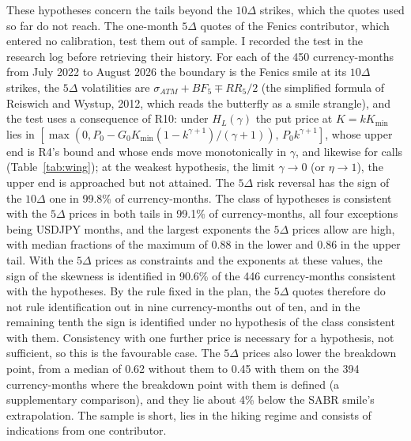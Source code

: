 \documentclass[11pt]{article}
\theoremstyle{result}
\newcommand{\D}{\Delta}
\begin{document}
These hypotheses concern the tails beyond the $10\D$ strikes, which the quotes used so far do not reach. The one-month $5\D$ quotes of the Fenics contributor, which entered no calibration, test them out of sample. I recorded the test in the research log before retrieving their history. For each of the 450 currency-months from July 2022 to August 2026 the boundary is the Fenics smile at its $10\D$ strikes, the $5\D$ volatilities are $\sigma_{ATM}+BF_5\mp RR_5/2$ (the simplified formula of Reiswich and Wystup, 2012, which reads the butterfly as a smile strangle), and the test uses a consequence of R10: under $H_L(\gamma)$ the put price at $K=kK_{\min}$ lies in $[\max(0,P_0-G_0K_{\min}(1-k^{\gamma+1})/(\gamma+1)),\,P_0k^{\gamma+1}]$, whose upper end is R4's bound and whose ends move monotonically in $\gamma$, and likewise for calls (Table~\ref{tab:wing}); at the weakest hypothesis, the limit $\gamma\to0$ (or $\eta\to1$), the upper end is approached but not attained. The $5\D$ risk reversal has the sign of the $10\D$ one in 99.8\% of currency-months. The class of hypotheses is consistent with the $5\D$ prices in both tails in 99.1\% of currency-months, all four exceptions being USDJPY months, and the largest exponents the $5\D$ prices allow are high, with median fractions of the maximum of 0.88 in the lower and 0.86 in the upper tail. With the $5\D$ prices as constraints and the exponents at these values, the sign of the skewness is identified in 90.6\% of the 446 currency-months consistent with the hypotheses. By the rule fixed in the plan, the $5\D$ quotes therefore do not rule identification out in nine currency-months out of ten, and in the remaining tenth the sign is identified under no hypothesis of the class consistent with them. Consistency with one further price is necessary for a hypothesis, not sufficient, so this is the favourable case. The $5\D$ prices also lower the breakdown point, from a median of 0.62 without them to 0.45 with them on the 394 currency-months where the breakdown point with them is defined (a supplementary comparison), and they lie about 4\% below the SABR smile's extrapolation. The sample is short, lies in the hiking regime and consists of indications from one contributor.
\end{document}
